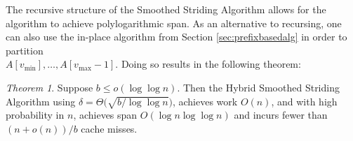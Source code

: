 \documentclass[sigconf, 10pt, nonacm]{acmart}
\newcommand{\defn}[1]{{\textit{\textbf{\boldmath #1}}}}
\renewcommand{\paragraph}[1]{\vspace{0.09in}\noindent{\bf \boldmath #1.}}
\theoremstyle{remark}
\newtheorem{theorem}{Theorem}[section]
\theoremstyle{remark}
\begin{document}
The recursive structure of the Smoothed Striding Algorithm allows for
the algorithm to achieve polylogarithmic span. As an alternative to
recursing, one can also use the in-place algorithm from Section \ref{sec:prefixbasedalg}
 in order to partition \\ $A[v_{\text{min}}], \ldots,
  A[v_{\text{max}} - 1]$. Doing so results in the following theorem:
\begin{theorem}
  \label{thm:nicethm}
Suppose $b \le o(\log \log n)$. Then the Hybrid Smoothed Striding Algorithm
using $\delta = \Theta\big(\sqrt{b/\log\log n}\big)$, achieves work $O(n)$, and
with high probability in $n$, achieves span $O(\log n \log\log n)$ and incurs
fewer than $(n+o(n))/b$ cache misses.
\end{theorem}



\end{document}
